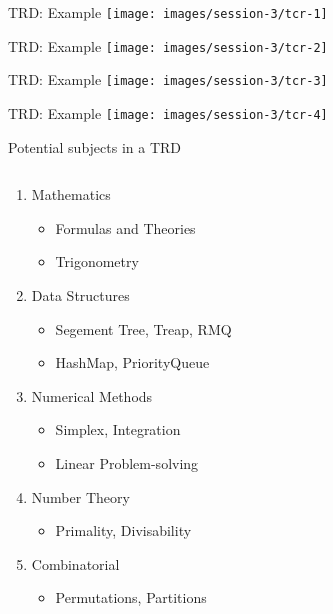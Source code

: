 \documentclass[11pt,pdf, aspectratio=169]{beamer}
\begin{document}
  \begin{frame}{TRD: Example}
    \texttt{[image: images/session-3/tcr-1]}
  \end{frame}
  \begin{frame}{TRD: Example}
    \texttt{[image: images/session-3/tcr-2]}
  \end{frame}
  \begin{frame}{TRD: Example}
    \texttt{[image: images/session-3/tcr-3]}
  \end{frame}
  \begin{frame}{TRD: Example}
    \texttt{[image: images/session-3/tcr-4]}
  \end{frame}
  \begin{frame}{Potential subjects in a TRD}
    \begin{columns}
      \begin{column}{.45\textwidth}
        \begin{enumerate}
          \item Mathematics
          \begin{itemize}
            \item Formulas and Theories
            \item Trigonometry
          \end{itemize}
          \item Data Structures
          \begin{itemize}
            \item Segement Tree, Treap, RMQ
            \item HashMap, PriorityQueue
          \end{itemize}
          \item Numerical Methods
          \begin{itemize}
            \item Simplex, Integration
            \item Linear Problem-solving
          \end{itemize}
          \item Number Theory
          \begin{itemize}
            \item Primality, Divisability
          \end{itemize}
          \item Combinatorial
          \begin{itemize}
            \item Permutations, Partitions
          \end{itemize}

\end{enumerate}
\end{column}
\end{columns}
\end{frame}
\end{document}
